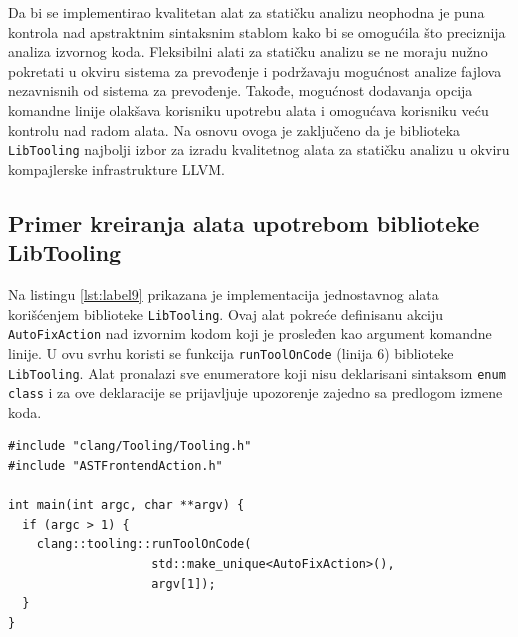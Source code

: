 \documentclass[12pt,oneside]{memoir}
\begin{document}
Da bi se implementirao kvalitetan alat za stati\v{c}ku analizu neophodna je puna kontrola nad apstraktnim sintaksnim stablom kako bi se omogu\'{c}ila \v{s}to preciznija analiza izvornog koda. Fleksibilni alati za stati\v{c}ku analizu se ne moraju nu\v{z}no pokretati u okviru sistema za prevođenje i podr\v{z}avaju mogu\'{c}nost analize fajlova nezavnisnih od sistema za prevođenje. Takođe, mogu\'{c}nost dodavanja opcija komandne linije olak\v{s}ava korisniku upotrebu alata i omogu\'{c}ava korisniku ve\'{c}u kontrolu nad radom alata. Na osnovu ovoga je zaklju\v{c}eno da je biblioteka \texttt{LibTooling} najbolji izbor za izradu kvalitetnog alata za stati\v{c}ku analizu u okviru kompajlerske infrastrukture LLVM.

\subsection{Primer kreiranja alata upotrebom biblioteke LibTooling}

Na listingu \ref{lst:label9} prikazana je implementacija jednostavnog alata kori\v{s}\'{c}enjem biblioteke \texttt{LibTooling}. Ovaj alat pokre\'{c}e definisanu akciju \texttt{AutoFixAction} nad izvornim kodom koji je prosleđen kao argument komandne linije. U ovu svrhu koristi se funkcija \texttt{runToolOnCode} (linija 6) biblioteke \texttt{LibTooling}. Alat pronalazi sve enumeratore koji nisu deklarisani sintaksom \texttt{enum class} i za ove deklaracije se prijavljuje upozorenje zajedno sa predlogom izmene koda. 

\begin{lstlisting}[style=customc,  caption={Primer implementacije jednostavnog alata upotrebom biblioteke \texttt{LibTooling}. Alat koristi klasu \texttt{AutoFixAction} sa listinga \ref{lst:ASTAction} dostupnom kroz zaglavlje \texttt{ASTFrontendAction.h}.}, label=lst:label9]
#include "clang/Tooling/Tooling.h"
#include "ASTFrontendAction.h"

int main(int argc, char **argv) {
  if (argc > 1) {
    clang::tooling::runToolOnCode(
                    std::make_unique<AutoFixAction>(),
                    argv[1]);
  }
}
\end{lstlisting}
\end{document}
